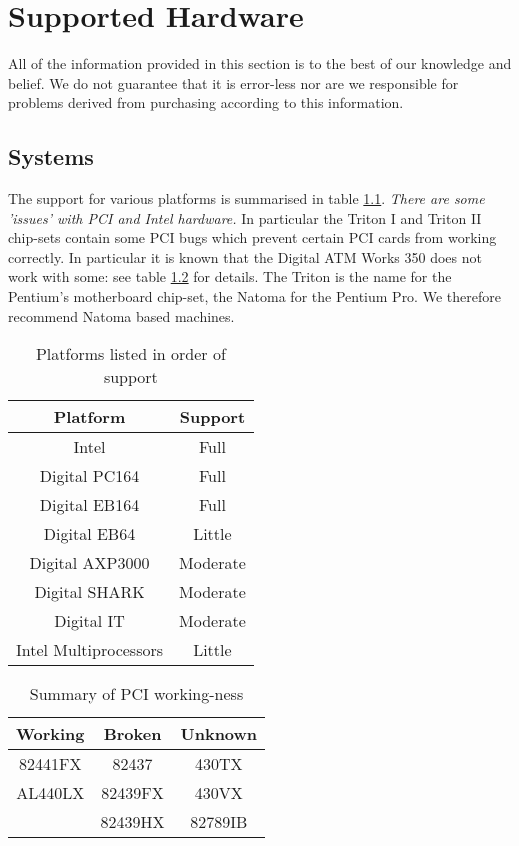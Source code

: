 
\chapter{Supported Hardware}
\label{sec:hardware}

All of the information provided in this section is to the best of our
knowledge and belief.  We do not guarantee that it is error-less nor
are we responsible for problems derived from purchasing according to
this information.

\section{Systems}

The support for various platforms is summarised in table
\ref{tab:support}.  \emph{There are some 'issues' with PCI and Intel
  hardware.}  In particular the Triton I and Triton II chip-sets
contain some PCI bugs which prevent certain PCI cards from working
correctly.  In particular it is known that the Digital ATM Works 350
does not work with some: see table \ref{tab:workingpci} for details.  The
Triton is the name for the Pentium's motherboard chip-set, the Natoma
for the Pentium Pro.  We therefore recommend Natoma based machines.
  
\begin{table}[htb]
\begin{center}
\begin{tabular}{c|c}
Platform & Support \\ \hline
Intel & Full \\
Digital PC164 & Full \\
Digital EB164 & Full \\
Digital EB64 & Little \\
Digital AXP3000 & Moderate \\
Digital SHARK & Moderate \\
Digital IT & Moderate \\
Intel Multiprocessors & Little \\
\end{tabular}
\end{center}
\caption{Platforms listed in order of support}
\label{tab:support}
\end{table}

\begin{table}[htb]
\begin{center}
\begin{tabular}{c|c|c}
Working    & Broken     & Unknown \\ \hline
82441FX    & 82437      & 430TX       \\
AL440LX    & 82439FX    & 430VX       \\
           & 82439HX    & 82789IB     \\
\end{tabular}
\end{center}
\caption{Summary of PCI working-ness}
\label{tab:workingpci}
\end{table}

